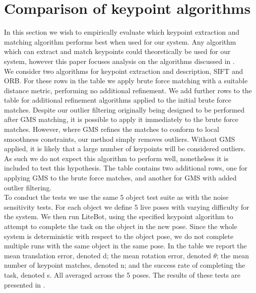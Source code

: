 \section{Comparison of keypoint algorithms}
\label{sec:algos-test}
In this section we wish to empirically evaluate which keypoint extraction and matching algorithm performs best when used for our system. Any algorithm which can extract and match keypoints could theoretically be used for our system, however this paper focuses analysis on the algorithms discussed in .\\

We consider two algorithms for keypoint extraction and description, SIFT and ORB. For these rows in the table we apply brute force matching with a suitable distance metric, performing no additional refinement. We add further rows to the table for additional refinement algorithms applied to the initial brute force matches. Despite our outlier filtering originally being designed to be performed after GMS matching, it is possible to apply it immediately to the brute force matches. However, where GMS refines the matches to conform to local smoothness constraints, our method simply removes outliers. Without GMS applied, it is likely that a large number of keypoints will be considered outliers. As such we do not expect this algorithm to perform well, nonetheless it is included to test this hypothesis. The table contains two additional rows, one for applying GMS to the brute force matches, and another for GMS with added outlier filtering.\\

To conduct the tests we use the same 5 object test suite as with the noise sensitivity tests. For each object we define 5 live poses with varying difficulty for the system. We then run LiteBot, using the specified keypoint algorithm to attempt to complete the task on the object in the new pose. Since the whole system is deterministic with respect to the object pose, we do not complete multiple runs with the same object in the same pose. In the table we report the mean translation error, denoted d; the mean rotation error, denoted $\theta$; the mean number of keypoint matches, denoted n; and the success rate of completing the task, denoted s. All averaged across the 5 poses. The results of these tests are presented in .\\

